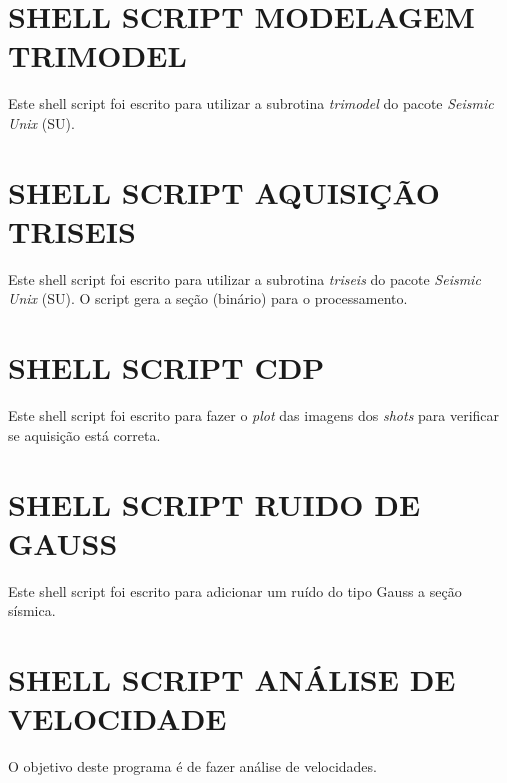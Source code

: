\appendix
\label{apendice}

\chapter{SHELL SCRIPT MODELAGEM TRIMODEL}
\label{apendice_A}

Este shell script foi escrito para utilizar a subrotina \textit{trimodel} do pacote \textit{Seismic Unix} (SU). 





\chapter{SHELL SCRIPT AQUISIÇÃO TRISEIS}
\label{apendice_B}

Este shell script foi escrito para utilizar a subrotina \textit{triseis} do pacote \textit{Seismic Unix} (SU). 
O script gera a seção (binário) para o processamento.



\chapter{SHELL SCRIPT CDP}
\label{apendice_C}

Este shell script foi escrito para fazer o \textit{plot} das imagens dos \textit{shots} para verificar se aquisição está correta.



\chapter{SHELL SCRIPT RUIDO DE GAUSS}
\label{apendice_D}

Este shell script foi escrito para adicionar um ruído do tipo Gauss a seção sísmica.



\chapter{SHELL SCRIPT ANÁLISE DE VELOCIDADE}
\label{apendice_E}

O objetivo deste programa é de fazer análise de velocidades. 

